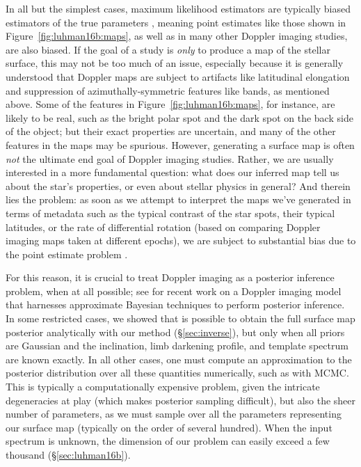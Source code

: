 \documentclass[modern]{aastex631}
\begin{document}
In all but the simplest cases, maximum likelihood estimators are typically biased estimators of the true parameters \citep[e.g.,][]{Lehman1998}, meaning point estimates like those shown in Figure~\ref{fig:luhman16b:maps}, as well as in many other Doppler imaging studies, are also biased.
If the goal of a study is \emph{only} to produce a map of the stellar surface, this may not be too much of an issue, especially because it is generally understood that Doppler maps are subject to artifacts like latitudinal elongation and suppression of azimuthally-symmetric features like bands, as mentioned above.
Some of the features in Figure~\ref{fig:luhman16b:maps}, for instance, are likely to be real, such as the bright polar spot and the dark spot on the back side of the object; but their exact properties are uncertain, and many of the other features in the maps may be spurious.
However, generating a surface map is often \emph{not} the ultimate end goal of Doppler imaging studies.
Rather, we are usually interested in a more fundamental question: what does our inferred map tell us about the star's properties, or even about stellar physics in general?
And therein lies the problem: as soon as we attempt to interpret the maps we've generated in terms of metadata such as the typical contrast of the star spots, their typical latitudes, or  the rate of differential rotation (based on comparing Doppler imaging maps taken at different epochs), we are subject to substantial bias due to the point estimate problem \citep[for an example of this same problem in the context of inferring the exoplanet eccentricity distribution, see][]{Hogg2010}.

For this reason, it is crucial to treat Doppler imaging as a posterior inference problem, when at all possible; see \citet{AsensioRamos2021} for recent work on a Doppler imaging model that harnesses approximate Bayesian techniques to perform posterior inference. 
In some restricted cases, we showed that is possible to obtain the full surface map posterior analytically with our method (\S\ref{sec:inverse}), but only when all priors are Gaussian and the inclination, limb darkening profile, and template spectrum are known exactly. 
In all other cases, one must compute an approximation to the posterior distribution over all these quantities numerically, such as with MCMC.
This is typically a computationally expensive problem, given the intricate degeneracies at play (which makes posterior sampling difficult), but also the sheer number of parameters, as we must sample over all the parameters representing our surface map (typically on the order of several hundred). 
When the input spectrum is unknown, the dimension of our problem can easily exceed a few thousand (\S\ref{sec:luhman16b}).
\end{document}
